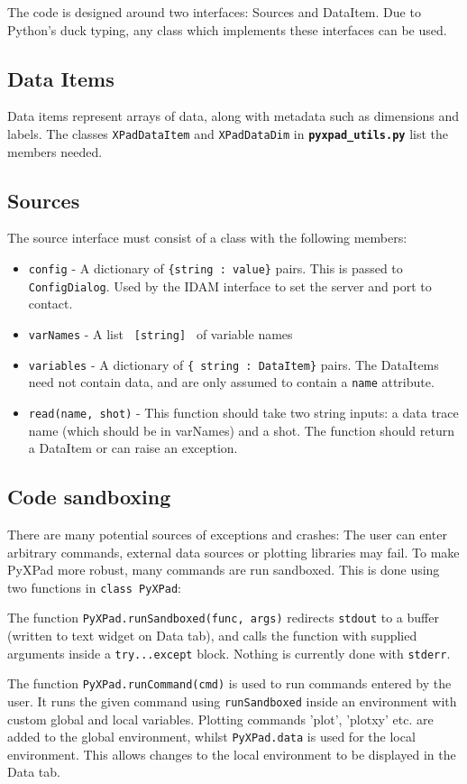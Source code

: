 \documentclass[12pt, a4paper]{article}
\newcommand{\code}[1]{\texttt{#1}}
\newcommand{\file}[1]{\texttt{\bf #1}}
\begin{document}
The code is designed around two interfaces: Sources and DataItem. 
Due to Python's duck typing, any class which implements these interfaces can be used.

\subsection{Data Items}

Data items represent arrays of data, along with metadata such as dimensions and labels. The classes \code{XPadDataItem} and \code{XPadDataDim} in \file{pyxpad\_utils.py} list the members needed.

\subsection{Sources}

The source interface must consist of 
a class with the following members:
\begin{itemize}
\item \code{config}    - A dictionary of \code{\{string : value\}}  pairs. This is passed to \code{ConfigDialog}. Used by the IDAM interface to set the server and port to contact.
\item \code{varNames} - A list \code{ [string] } of variable names
\item \code{variables}  - A dictionary of \code{\{ string : DataItem\}} pairs. The DataItems need not contain data, and are only assumed to contain a \code{name} attribute. 
\item \code{read(name, shot)} - This function should take two string inputs: a data trace name (which should be in varNames) and a shot. The function should return a DataItem or can raise an exception.
\end{itemize}

\subsection{Code sandboxing}

There are many potential sources of exceptions and crashes: The user can
enter arbitrary commands, external data sources or plotting libraries
may fail. To make PyXPad more robust, many commands are run sandboxed.
This is done using two functions in \code{class PyXPad}:

The function \code{PyXPad.runSandboxed(func, args)} redirects \code{stdout}
to a buffer (written to text widget on Data tab), and calls the function
with supplied arguments inside a \code{try...except} block. Nothing is currently done with \code{stderr}.

The function \code{PyXPad.runCommand(cmd)} is used to run commands entered by the user. It runs the given command using \code{runSandboxed} inside an environment with custom global and local variables. Plotting commands 'plot', 'plotxy' etc. are added to the global environment, whilst \code{PyXPad.data} is used for the local environment. This allows changes to the local environment to be displayed in the Data tab.
\end{document}
